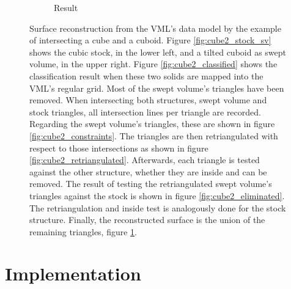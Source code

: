\begin{figure}
\begin{subfigure}[t]{0.3\textwidth}
		\caption{Result}
		\label{fig:cube2_result}
	\end{subfigure}
	\caption{
		Surface reconstruction from the VML's data model by the example of intersecting a cube and a cuboid.
		Figure \ref{fig:cube2_stock_sv} shows the cubic stock, in the lower left, and a tilted cuboid as swept volume, in the upper right.
		Figure \ref{fig:cube2_classified} shows the classification result when these two solids are mapped into the VML's regular grid.
		Most of the swept volume's triangles have been removed.
		When intersecting both structures, \ie swept volume and stock triangles, all intersection lines per triangle are recorded.
		Regarding the swept volume's triangles, these are shown in figure \ref{fig:cube2_constraints}.
		The triangles are then retriangulated with respect to those intersections as shown in figure \ref{fig:cube2_retriangulated}.
		Afterwards, each triangle is tested against the other structure, whether they are inside and can be removed.
		The result of testing the retriangulated swept volume's triangles against the stock is shown in figure \ref{fig:cube2_eliminated}.
		The retriangulation and inside test is analogously done for the stock structure.
		Finally, the reconstructed surface is the union of the remaining triangles, figure \ref{fig:cube2_result}.
	}
	\label{fig:cube2}
\end{figure}


\section{Implementation}
\label{sec:direct_intersection_implementation}

